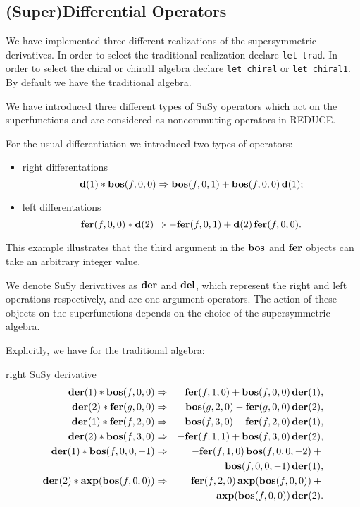 {\subsection{(Super)Differential Operators}

We have implemented three different realizations of the supersymmetric
derivatives.  In order to select the traditional realization declare
\texttt{let trad}.  In order to select the chiral or chiral1 algebra
declare \texttt{let chiral} or \texttt{let chiral1}.  By default we
have the traditional algebra.

We have introduced three different types of SuSy operators which act
on the superfunctions and are considered as noncommuting operators in
REDUCE.

For the usual differentiation we introduced two types of operators:
\begin{itemize}
\item right differentations
  \begin{equation*}
    \mathbf{d}(1)*\mathbf{bos}(f,0,0) \Rightarrow  \mathbf{bos}(f,0,1) + \mathbf{bos}(f,0,0)\,\mathbf{d}(1);
  \end{equation*}
\item left differentations
  \begin{equation*}
    \mathbf{fer}(f,0,0)*\mathbf{d}(2) \Rightarrow -\mathbf{fer}(f,0,1) + \mathbf{d}(2)\,\mathbf{fer}(f,0,0).
  \end{equation*}
\end{itemize}
This example illustrates that the third argument in the $\mathbf{bos}$ and
$\mathbf{fer}$ objects can take an arbitrary integer value.

We denote SuSy derivatives as $\mathbf{der}$ and $\mathbf{del}$, which represent the
right and left operations respectively, and are one-argument
operators.  The action of these objects on the superfunctions depends
on the choice of the supersymmetric algebra.

Explicitly, we have for the traditional algebra:
\begin{description}
\item{right SuSy derivative}
  \begin{eqnarray*}
    \mathbf{der}(1)*\mathbf{bos}(f,0,0) &\Rightarrow&  \mathbf{fer}(f,1,0)+\mathbf{bos}(f,0,0)\,\mathbf{der}(1), \\
    \mathbf{der}(2)*\mathbf{fer}(g,0,0) &\Rightarrow&  \mathbf{bos}(g,2,0)-\mathbf{fer}(g,0,0)\,\mathbf{der}(2), \\
    \mathbf{der}(1)*\mathbf{fer}(f,2,0) &\Rightarrow&  \mathbf{bos}(f,3,0)-\mathbf{fer}(f,2,0)\,\mathbf{der}(1), \\
    \mathbf{der}(2)*\mathbf{bos}(f,3,0) &\Rightarrow& -\mathbf{fer}(f,1,1)+\mathbf{bos}(f,3,0)\,\mathbf{der}(2), \\
    \mathbf{der}(1)*\mathbf{bos}(f,0,0,-1) &\Rightarrow& -\mathbf{fer}(f,1,0)\,\mathbf{bos}(f,0,0,-2) + \mbox{}\\
    && \mathbf{bos}(f,0,0,-1)\,\mathbf{der}(1), \\
    \mathbf{der}(2)*\mathbf{axp}(\mathbf{bos}(f,0,0)) &\Rightarrow&
    \mathbf{fer}(f,2,0)\,\mathbf{axp}(\mathbf{bos}(f,0,0)) + \mbox{}\\
    && \mathbf{axp}(\mathbf{bos}(f,0,0))\,\mathbf{der}(2).
  \end{eqnarray*}


\end{description}}
